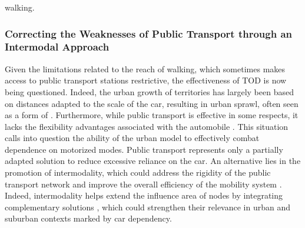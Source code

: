 \begin{refsegment}
walking.%

\subsubsection*{Correcting the Weaknesses of Public Transport through an Intermodal Approach
    \label{chap1:btod-definition-intermodalite}
    }

Given the limitations related to the reach of walking, which sometimes makes access to public transport stations restrictive, the effectiveness of \acrshort{TOD} is now being questioned. Indeed, the urban growth of territories has largely been based on distances adapted to the scale of the car, resulting in urban sprawl, often seen as a form of . Furthermore, while public transport is effective in some respects, it lacks the flexibility advantages associated with the automobile \textcolor{blue}{\autocite[209]{heran_retour_2015}}. This situation calls into question the ability of the urban model to effectively combat dependence on motorized modes. Public transport represents only a partially adapted solution to reduce excessive reliance on the car. An alternative lies in the promotion of intermodality, which could address the rigidity of the public transport network \textcolor{blue}{\autocite[17]{wiel_comment_1998}} and improve the overall efficiency of the mobility system \textcolor{blue}{\autocite[82]{oostendorp_combining_2018}}. Indeed, intermodality helps extend the influence area of nodes by integrating complementary solutions \textcolor{blue}{\autocite[16]{amar_homo_2016}}, which could strengthen their relevance in urban and suburban contexts marked by car dependency.%


\end{refsegment}
